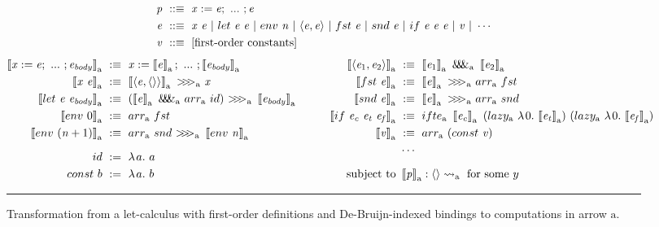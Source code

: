 \documentclass[preprint]{sigplanconf}
\newcommand{\arrow}{\rightsquigarrow}
\newcommand{\arrowarr}{\ensuremath{arr}}
\newcommand{\arrowcomp}{\ensuremath{{>}\mspace{-6mu}{>}\mspace{-6mu}{>}}}
\newcommand{\arrowpair}{\ensuremath{\mathit{\&\mspace{-7.5mu}\&\mspace{-7.5mu}\&}}}
\newcommand{\arrowif}{\ensuremath{ifte}}
\newcommand{\arrowlazy}{\ensuremath{lazy}}
\newcommand{\gen}{_\mathrm{a}}
\begin{document}
\begin{figure*}[t]
\begin{align*}
	\mathit{p} &\ ::\equiv \ \mathit{x := e};\ ...\ ; \mathit{e} \\
	\mathit{e} &\ ::\equiv \ \mathit{x~e}\ |\ let~\mathit{e~e}\ |\ env~\mathit{n}\ |\ \mathit{\pair{e,e}}\ |\ fst~\mathit{e}\ |\ snd~\mathit{e}\ |\ if~\mathit{e~e~e}\ |\ \mathit{v}\ |\ \cdots \\
	\mathit{v} &\ ::\equiv \ \text{[first-order constants]}
\end{align*}
\begin{align*}
\begin{aligned}[t]
	\meaningof{\mathit{x} := \mathit{e};\ ...\ ; \mathit{e_{body}}}\gen &\ :\equiv\
		\mathit{x} := \meaningof{\mathit{e}}\gen;\ ...\ ; \meaningof{\mathit{e_{body}}}\gen \\
	\meaningof{\mathit{x}~\mathit{e}}\gen &\ :\equiv\
		\meaningof{\pair{\mathit{e},\pair{}}}\gen~\arrowcomp\gen~\mathit{x}
\\
	\meaningof{let~\mathit{e}~\mathit{e_{body}}}\gen &\ :\equiv\ 
		(\meaningof{\mathit{e}}\gen~\arrowpair\gen~\arrowarr\gen~id)~
			\arrowcomp\gen~
		\meaningof{\mathit{e_{body}}}\gen
\\
	\meaningof{env~0}\gen &\ :\equiv\ \arrowarr\gen~fst
\\
	\meaningof{env~(\mathit{n}+1)}\gen &\ :\equiv\ \arrowarr\gen~snd~\arrowcomp\gen~\meaningof{env~\mathit{n}}\gen
\\[6pt]
	id &\ := \ \fun{a} a
\\
	const~b &\ := \ \fun{a} b
\\
\end{aligned}
&\tab\tab\tab
\begin{aligned}[t]
	\meaningof{\pair{\mathit{e}_1,\mathit{e}_2}}\gen &\ :\equiv\
		\meaningof{\mathit{e}_1}\gen~\arrowpair\gen~\meaningof{\mathit{e}_2}\gen
\\
	\meaningof{fst~\mathit{e}}\gen &\ :\equiv\
		\meaningof{\mathit{e}}\gen~\arrowcomp\gen~\arrowarr\gen~fst
\\
	\meaningof{snd~\mathit{e}}\gen &\ :\equiv\
		\meaningof{\mathit{e}}\gen~\arrowcomp\gen~\arrowarr\gen~snd
\\
	\meaningof{if~\mathit{e_c}~\mathit{e_t}~\mathit{e_f}}\gen &\ :\equiv\
		\arrowif\gen~
			\meaningof{\mathit{e_c}}\gen~
			(\arrowlazy\gen~\fun{0}{\meaningof{\mathit{e_t}}\gen})~
			(\arrowlazy\gen~\fun{0}{\meaningof{\mathit{e_f}}\gen})
\\
	\meaningof{\mathit{v}}\gen &\ :\equiv\ \arrowarr\gen~(const~\mathit{v})
\\
	&\ \cdots
\\[6pt]
	\text{subject to} &\ \meaningof{\mathit{p}}\gen : \pair{} \arrow\gen \ \text{for some $y$}
\end{aligned}
\end{align*}
\hrule
\caption{Transformation from a let-calculus with first-order definitions and De-Bruijn-indexed bindings to computations in arrow $\mathrm{a}$.
}
\label{fig:semantic-function}
\end{figure*}
\end{document}
